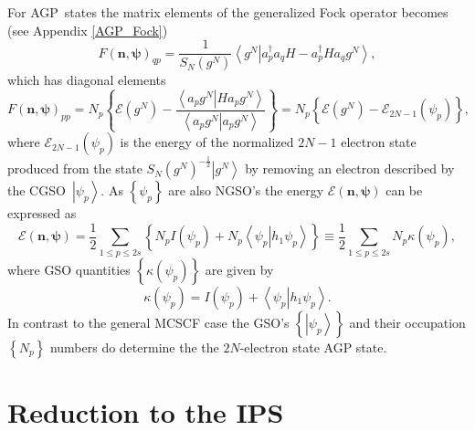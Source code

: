 \documentclass[aps,preprint]{revtex4}%
\begin{document}
For AGP\ states the matrix elements of the generalized Fock operator becomes
(see Appendix \ref{AGP_Fock})
\begin{equation}
F\left(  \bm{n},\bm{\psi}\right)  _{qp}=\frac{1}{S_{N}\left(  g^{N}\right)
}\left\langle \left.  g^{N}\right\vert a_{p}^{\dagger}a_{q}H-a_{p}^{\dagger
}Ha_{q}g^{N}\right\rangle ,
\end{equation}
which has diagonal elements
\begin{equation}
F\left(  \bm{n},\bm{\psi}\right)  _{pp}=N_{p}\left\{  \mathcal{E}\left(
g^{N}\right)  -\frac{\left\langle \left.  a_{p}g^{N}\right\vert Ha_{p}%
g^{N}\right\rangle }{\left\langle \left.  a_{p}g^{N}\right\vert a_{p}%
g^{N}\right\rangle }\right\}  =N_{p}\left\{  \mathcal{E}\left(  g^{N}\right)
-\mathcal{E}_{2N-1}\left(  \psi_{p}\right)  \right\}  ,
\end{equation}
where $\mathcal{E}_{2N-1}\left(  \psi_{p}\right)  $ is the energy of the
normalized $2N-1$ electron state produced from the state $S_{N}\left(
g^{N}\right)  ^{-\frac{1}{2}}\left\vert g^{N}\right\rangle $ by removing an
electron described by the CGSO\ $\left\vert \psi_{p}\right\rangle $. As
$\left\{  \psi_{p}\right\}  $ are also NGSO's the energy $\mathcal{E}\left(
\bm{n},\bm{\psi}\right)  $ can be expressed as
\begin{equation}
\mathcal{E}\left(  \bm{n},\bm{\psi}\right)  =\frac{1}{2}\sum_{1\leq p\leq
2s}\left\{  N_{p}I\left(  \psi_{p}\right)  +N_{p}\left\langle \left.  \psi
_{p}\right\vert h_{1}\psi_{p}\right\rangle \right\}  \equiv\frac{1}{2}%
{\textstyle\sum\limits_{1\leq p\leq2s}}
N_{p}\kappa\left(  \psi_{p}\right)  ,
\end{equation}
where GSO quantities $\left\{  \kappa\left(  \psi_{p}\right)  \right\}  $ are
given by
\begin{equation}
\kappa\left(  \psi_{p}\right)  =I\left(  \psi_{p}\right)  +\left\langle
\left.  \psi_{p}\right\vert h_{1}\psi_{p}\right\rangle .
\end{equation}
In contrast to the general MCSCF case the GSO's $\left\{  \left\vert \psi
_{p}\right\rangle \right\}  $ and their occupation $\left\{  N_{p}\right\}  $
numbers do determine the the $2N$-electron state AGP state.

\section{Reduction to the IPS \label{IPS}}
\end{document}
